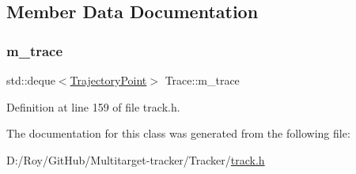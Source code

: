 \subsection{Member Data Documentation}
\mbox{\label{class_trace_a2650850103966a19b5cbac6db8df8b66}} 
\subsubsection{\texorpdfstring{m\+\_\+trace}{m\_trace}}
{\footnotesize\ttfamily std\+::deque$<$\mbox{\hyperlink{struct_trajectory_point}{Trajectory\+Point}}$>$ Trace\+::m\+\_\+trace\hspace{0.3cm}{\ttfamily [private]}}



Definition at line 159 of file track.\+h.



The documentation for this class was generated from the following file\+:\begin{DoxyCompactItemize}
\item 
D\+:/\+Roy/\+Git\+Hub/\+Multitarget-\/tracker/\+Tracker/\mbox{\hyperlink{track_8h}{track.\+h}}\end{DoxyCompactItemize}
